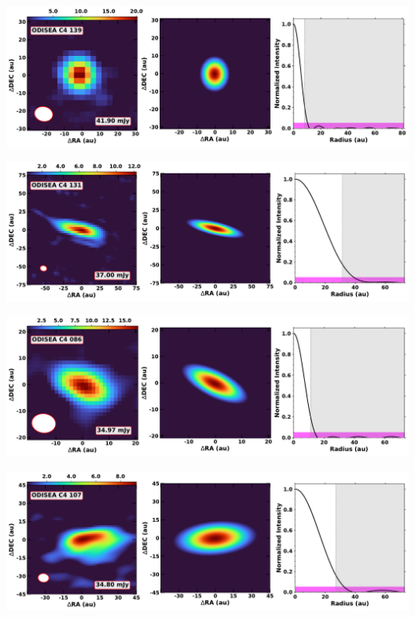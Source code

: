 \vspace{0pt}
\begin{minipage}{.49\textwidth}
	 \centering
	 	 \hrulesep
	 	 \includegraphics[width=1\linewidth]{pdf/0+I_F/048_odisea_c4_139_cutout.pdf}
\end{minipage}%
\vrulesep
\begin{minipage}{.49\textwidth}
	 \centering
	 	 \hrulesep
	 	 \includegraphics[width=1\linewidth]{pdf/0+I_F/044_odisea_c4_131_cutout.pdf}
\end{minipage}%
\vspace{0pt}
\begin{minipage}{.49\textwidth}
	 \centering
	 	 \hrulesep
	 	 \includegraphics[width=1\linewidth]{pdf/0+I_F/041_odisea_c4_086_cutout.pdf}
\end{minipage}%
\vrulesep
\begin{minipage}{.49\textwidth}
	 \centering
	 	 \hrulesep
	 	 \includegraphics[width=1\linewidth]{pdf/0+I_F/040_odisea_c4_107_cutout.pdf}
\end{minipage}%
